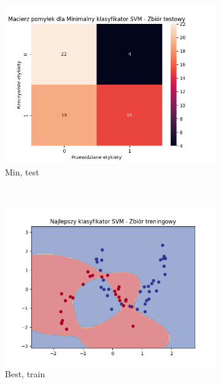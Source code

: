 \documentclass[12pt]{article}
\newcommand*{\subfigwidth}{0.24\textwidth}
\begin{document}
\begin{figure}[H]
\begin{subfigure}[t]{\subfigwidth}
        \includegraphics[width=\linewidth]{img/exp_3/svm/2_3/min/test_matrix.png}
        \caption{Min, test}
    \end{subfigure}
    \\
    \begin{subfigure}[t]{\subfigwidth}
        \includegraphics[width=\linewidth]{img/exp_3/svm/2_3/best/train_boundary.png}
        \caption{Best, train}
    \end{subfigure}
    \hfill
    \begin{subfigure}[t]{\subfigwidth}

\end{subfigure}
\end{figure}
\end{document}
